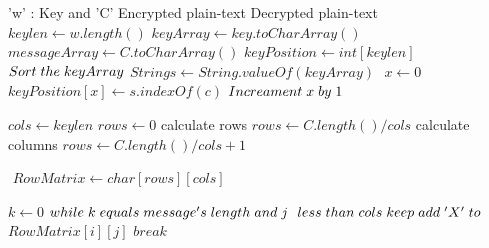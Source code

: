 \documentclass[twoside,twocolumn]{article}
\begin{document}
\begin{algorithm}
  \caption{}\label{}
  \begin{algorithmic}[1]
  	\footnotesize
    \Require 'w' : Key and 'C' Encrypted plain-text
    \Ensure Decrypted plain-text
      \State $keylen \gets w.length()$
      \State $keyArray \gets key.toCharArray() $
      \State $messageArray \gets C.toCharArray() $
      \State $keyPosition \gets int [keylen]$
      \State \footnotesize$ $
	  \State $Sort\hspace{0.1cm} the \hspace{0.1cm}keyArray$
	  \State $String s \gets String.valueOf(keyArray)$	  
	  \State \footnotesize$ $
	  \State $x \gets 0$
        \State $keyPosition[x] \gets s.indexOf(c)$
        \State $Increament \hspace{0.1cm} x \hspace{0.1cm} by \hspace{0.1cm}1$	
      \EndFor
     
      \State $cols \gets keylen$
      \State $rows \gets 0$
	   \Comment \tiny{calculate rows}
        \State\footnotesize $rows \gets C.length() / cols$
      \Else \Comment \tiny{calculate columns}
        \State \footnotesize$rows \gets C.length() / cols + 1$
     \EndIf
     
      \State \footnotesize$ $
      \State  $RowMatrix \gets char[rows][cols] $
       
 
	  \State $k \gets 0$
        	   \State $while \hspace{0.1cm} k \hspace{0.1cm} equals \hspace{0.1cm} message's \hspace{0.1cm} length \hspace{0.1cm} and \hspace{0.1cm} j \hspace{0.1cm}   $
        	   \State $less \hspace{0.1cm}than \hspace{0.1cm} cols \hspace{0.1cm} keep \hspace{0.1cm}add \hspace{0.1cm}'X' \hspace{0.1cm} to \hspace{0.1cm}$
        	   \State $RowMatrix[i][j]$
        	   \State $break$
        	  

\end{algorithmic}
\end{algorithm}
\end{document}
